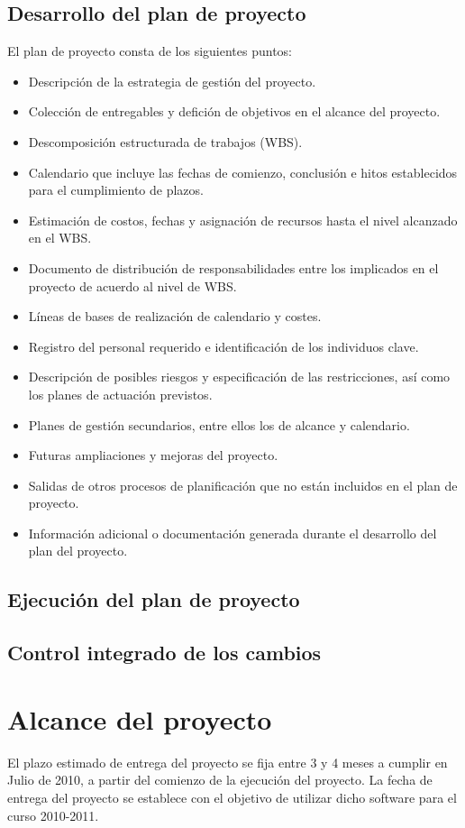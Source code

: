 \documentclass[11pt,a4paper,spanish,twoside]{report}
\begin{document}
\section{Desarrollo del plan de proyecto}

El plan de proyecto consta de los siguientes puntos:
\begin{itemize}
\item Descripción de la estrategia de gestión del proyecto.
\item Colección de entregables y defición de objetivos en el alcance del 
proyecto.
\item Descomposición estructurada de trabajos (WBS).
\item Calendario que incluye las fechas de comienzo, conclusión e hitos 
establecidos para el cumplimiento de plazos.
\item Estimación de costos, fechas y asignación de recursos hasta el nivel 
alcanzado en el WBS.
\item Documento de distribución de responsabilidades entre los implicados
en el proyecto de acuerdo al nivel de WBS.
\item Líneas de bases de realización de calendario y costes.
\item Registro del personal requerido e identificación de los individuos 
clave.
\item Descripción de posibles riesgos y especificación de las restricciones,
así como los planes de actuación previstos.
\item Planes de gestión secundarios, entre ellos los de alcance y calendario.
\item Futuras ampliaciones y mejoras del proyecto.
\item Salidas de otros procesos de planificación que no están incluidos en el 
plan de proyecto.
\item Información adicional o documentación generada durante el desarrollo del
plan del proyecto.  
\end{itemize}
\section{Ejecución del plan de proyecto}

\section{Control integrado de los cambios}

\chapter{Alcance del proyecto}
El plazo estimado de entrega del proyecto se fija entre 3 y 4 meses a cumplir
en Julio de 2010, a partir del comienzo de la ejecución del proyecto. La
fecha de entrega del proyecto se establece con el objetivo de utilizar dicho
software para el curso 2010-2011. 
\end{document}
